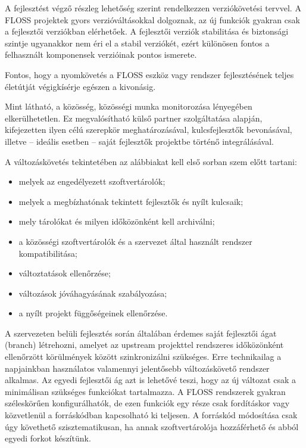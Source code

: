 \documentclass[12pt,magyar,a4paper,oneside]{scrreprt}
\providecommand{\tightlist}{%
  \setlength{\itemsep}{0pt}\setlength{\parskip}{0pt}}
\begin{document}
A fejlesztést végző részleg lehetőség szerint rendelkezzen
verziókövetési tervvel. A FLOSS projektek gyors verzióváltásokkal
dolgoznak, az új funkciók gyakran csak a fejlesztői verziókban
elérhetőek. A fejlesztői verziók stabilitása és biztonsági szintje
ugyanakkor nem éri el a stabil verziókét, ezért különösen fontos a
felhasznált komponensek verzióinak pontos ismerete.

Fontos, hogy a nyomkövetés a FLOSS eszköz vagy rendszer fejlesztésének
teljes életútját végigkísérje egészen a kivonásig.

Mint látható, a közösség, közösségi munka monitorozása lényegében
elkerülhetetlen. Ez megvalósítható külső partner szolgáltatása alapján,
kifejezetten ilyen célú szerepkör meghatározásával, kulcsfejlesztők
bevonásával, illetve -- ideális esetben -- saját fejlesztők projektbe
történő integrálásával.

A változáskövetés tekintetében az alábbiakat kell első sorban szem előtt
tartani:

\begin{itemize}
\tightlist
\item
  melyek az engedélyezett szoftvertárolók;
\item
  melyek a megbízhatónak tekintett fejlesztők és nyílt kulcsaik;
\item
  mely tárolókat és milyen időközönként kell archiválni;
\item
  a közösségi szoftvertárolók és a szervezet által használt rendszer
  kompatibilitása;
\item
  változtatások ellenőrzése;
\item
  változások jóváhagyásának szabályozása;
\item
  a nyílt projekt függőségeinek ellenőrzése.
\end{itemize}

A szervezeten belüli fejlesztés során általában érdemes saját fejlesztői
ágat (branch) létrehozni, amelyet az upstream projekttel rendszeres
időközönként ellenőrzött körülmények között szinkronizálni szükséges.
Erre technikailag a napjainkban használatos valamennyi jelentősebb
változáskövető rendszer alkalmas. Az egyedi fejlesztői ág azt is
lehetővé teszi, hogy az új változat csak a minimálisan szükséges
funkciókat tartalmazza. A FLOSS rendszerek gyakran széleskörűen
konfigurálhatók, de ezen funkciók egy része csak fordításkor vagy
közvetlenül a forráskódban kapcsolható ki teljesen. A forráskód
módosítása csak úgy követhető szisztematikusan, ha annak
szoftvertárolója hozzáférhető és abból egyedi forkot készítünk.
\end{document}
